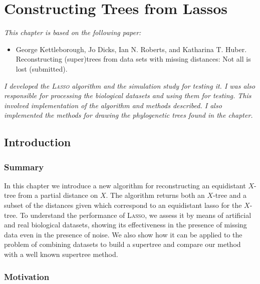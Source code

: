 \chapter{Constructing Trees from Lassos}
\label{cha:lasso-construction}

\textit{This chapter is based on the following paper:}

\vspace{0.5em}

\noindent

\begin{itemize}
\item George Kettleborough, Jo Dicks, Ian N. Roberts, and Katharina T. Huber.
  Reconstructing (super)trees from data sets with missing distances: Not all
  is lost (submitted).
\end{itemize}

\vspace{1em}

\textit{I developed the \textsc{Lasso} algorithm and the simulation study for
  testing it.  I was also responsible for processing the biological datasets
  and using them for testing.  This involved implementation of the algorithm
  and methods described.  I also implemented the methods for drawing the
  phylogenetic trees found in the chapter.}

\newpage

\section{Introduction}
\label{sec:introduction}

\subsection{Summary}

In this chapter we introduce a new algorithm for reconstructing an equidistant
$X$-tree from a partial distance on $X$.  The algorithm returns both an
$X$-tree and a subset of the distances given which correspond to an
equidistant lasso for the $X$-tree.  To understand the performance of
\textsc{Lasso}, we assess it by means of artificial and real biological
datasets, showing its effectiveness in the presence of missing data even in
the presence of noise.  We also show how it can be applied to the problem of
combining datasets to build a supertree and compare our method with a well
known supertree method.

\subsection{Motivation}
\label{sec:lasso-motivation}

